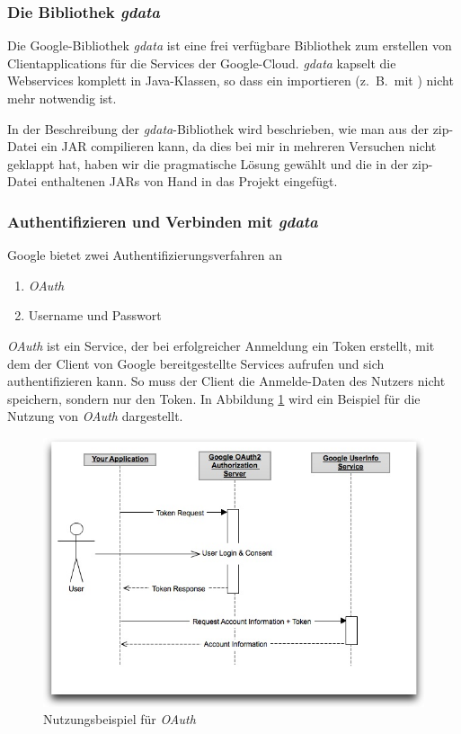 \subsubsection{Die Bibliothek \emph{gdata}}
Die Google-Bibliothek \emph{gdata} ist eine frei verf\"ugbare Bibliothek zum erstellen von
 Clientapplications für die Services der Google-Cloud.
\emph{gdata} kapselt die Webservices komplett in Java-Klassen, so dass ein importieren
 (z.\ B.\ mit \wsimport) nicht mehr notwendig ist.

In der Beschreibung der \emph{gdata}-Bibliothek wird beschrieben, wie man aus der zip-Datei
 ein JAR compilieren kann, da dies bei mir in mehreren Versuchen nicht geklappt hat,
 haben wir die pragmatische Lösung gewählt und die in der zip-Datei enthaltenen JARs von Hand
 in das Projekt eingefügt\cite{GO02}.

\subsubsection{Authentifizieren und Verbinden mit \emph{gdata}}
Google bietet zwei Authentifizierungsverfahren an
\begin{enumerate}
	\item\emph{OAuth}
	\item Username und Passwort
\end{enumerate}
\emph{OAuth} ist ein Service, der bei erfolgreicher Anmeldung ein Token erstellt, mit dem
 der Client von Google bereitgestellte Services aufrufen und sich authentifizieren kann.
So muss der Client die Anmelde-Daten des Nutzers nicht speichern, sondern nur den Token.
In Abbildung \ref{fig:google_oauth} wird ein Beispiel f\"ur die Nutzung von \emph{OAuth} dargestellt.
\begin{figure}[h!]
\includegraphics[width=\textwidth]{Bilder/googleOauth.jpg}
\caption{Nutzungsbeispiel f\"ur \emph{OAuth}\cite{GO01}}
\label{fig:google_oauth}
\end{figure}


